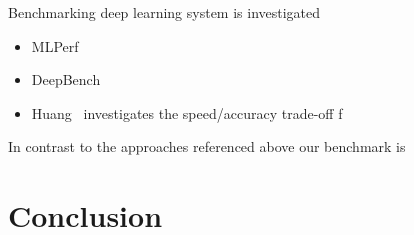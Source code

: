 \documentclass[conference]{IEEEtran}
\begin{document}
Benchmarking deep learning system is investigated

\begin{itemize}
    \item MLPerf
    \item DeepBench
    \item Huang~\cite{DBLP:journals/corr/HuangRSZKFFWSG016} investigates the speed/accuracy trade-off f
\end{itemize}

In contrast to the approaches referenced above our benchmark is 


\section{Conclusion}



%





\end{document}
